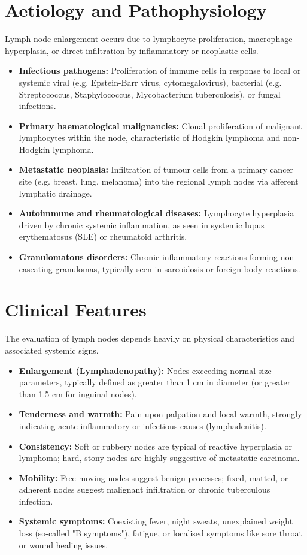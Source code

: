 \section*{Aetiology and Pathophysiology}
Lymph node enlargement occurs due to lymphocyte proliferation, macrophage hyperplasia, or direct infiltration by inflammatory or neoplastic cells.
\begin{itemize}
    \item \textbf{Infectious pathogens:} Proliferation of immune cells in response to local or systemic viral (e.g. Epstein-Barr virus, cytomegalovirus), bacterial (e.g. Streptococcus, Staphylococcus, Mycobacterium tuberculosis), or fungal infections.
    \item \textbf{Primary haematological malignancies:} Clonal proliferation of malignant lymphocytes within the node, characteristic of Hodgkin lymphoma and non-Hodgkin lymphoma.
    \item \textbf{Metastatic neoplasia:} Infiltration of tumour cells from a primary cancer site (e.g. breast, lung, melanoma) into the regional lymph nodes via afferent lymphatic drainage.
    \item \textbf{Autoimmune and rheumatological diseases:} Lymphocyte hyperplasia driven by chronic systemic inflammation, as seen in systemic lupus erythematosus (SLE) or rheumatoid arthritis.
    \item \textbf{Granulomatous disorders:} Chronic inflammatory reactions forming non-caseating granulomas, typically seen in sarcoidosis or foreign-body reactions.
\end{itemize}

\section*{Clinical Features}
The evaluation of lymph nodes depends heavily on physical characteristics and associated systemic signs.
\begin{itemize}
    \item \textbf{Enlargement (Lymphadenopathy):} Nodes exceeding normal size parameters, typically defined as greater than 1 cm in diameter (or greater than 1.5 cm for inguinal nodes).
    \item \textbf{Tenderness and warmth:} Pain upon palpation and local warmth, strongly indicating acute inflammatory or infectious causes (lymphadenitis).
    \item \textbf{Consistency:} Soft or rubbery nodes are typical of reactive hyperplasia or lymphoma; hard, stony nodes are highly suggestive of metastatic carcinoma.
    \item \textbf{Mobility:} Free-moving nodes suggest benign processes; fixed, matted, or adherent nodes suggest malignant infiltration or chronic tuberculous infection.
    \item \textbf{Systemic symptoms:} Coexisting fever, night sweats, unexplained weight loss (so-called "B symptoms"), fatigue, or localised symptoms like sore throat or wound healing issues.
\end{itemize}

